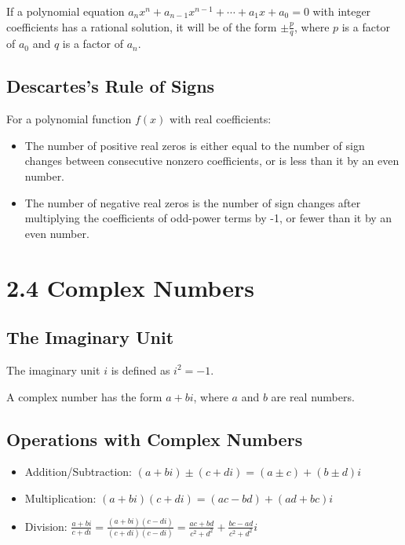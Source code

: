 \documentclass[12pt]{article}
\begin{document}
If a polynomial equation $a_nx^n + a_{n-1}x^{n-1} + \cdots + a_1x + a_0 = 0$ with integer coefficients has a rational solution, it will be of the form $\pm \frac{p}{q}$, where $p$ is a factor of $a_0$ and $q$ is a factor of $a_n$.

\subsection{Descartes's Rule of Signs}

For a polynomial function $f(x)$ with real coefficients:

\begin{itemize}
    \item The number of positive real zeros is either equal to the number of sign changes between consecutive nonzero coefficients, or is less than it by an even number.
    \item The number of negative real zeros is the number of sign changes after multiplying the coefficients of odd-power terms by -1, or fewer than it by an even number.
\end{itemize}

\section{2.4 Complex Numbers}

\subsection{The Imaginary Unit}

The imaginary unit $i$ is defined as $i^2 = -1$.

A complex number has the form $a + bi$, where $a$ and $b$ are real numbers.

\subsection{Operations with Complex Numbers}

\begin{itemize}
    \item Addition/Subtraction: $(a + bi) \pm (c + di) = (a \pm c) + (b \pm d)i$
    \item Multiplication: $(a + bi)(c + di) = (ac - bd) + (ad + bc)i$
    \item Division: $\frac{a + bi}{c + di} = \frac{(a + bi)(c - di)}{(c + di)(c - di)} = \frac{ac + bd}{c^2 + d^2} + \frac{bc - ad}{c^2 + d^2}i$
\end{itemize}
\end{document}

